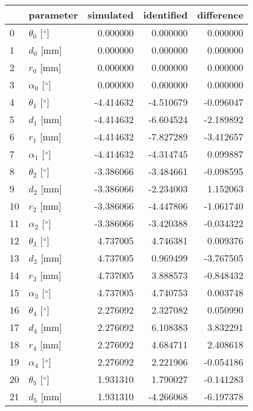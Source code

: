 \documentclass{standalone}%
\begin{document}
%
\normalsize%
\begin{tabular}{llrrr}
\toprule
{} &                 parameter & simulated & identified & difference \\
\midrule
0  &  $\theta_{0}$ [$\degree$] &  0.000000 &   0.000000 &   0.000000 \\
1  &              $d_{0}$ [mm] &  0.000000 &   0.000000 &   0.000000 \\
2  &              $r_{0}$ [mm] &  0.000000 &   0.000000 &   0.000000 \\
3  &  $\alpha_{0}$ [$\degree$] &  0.000000 &   0.000000 &   0.000000 \\
4  &  $\theta_{1}$ [$\degree$] & -4.414632 &  -4.510679 &  -0.096047 \\
5  &              $d_{1}$ [mm] & -4.414632 &  -6.604524 &  -2.189892 \\
6  &              $r_{1}$ [mm] & -4.414632 &  -7.827289 &  -3.412657 \\
7  &  $\alpha_{1}$ [$\degree$] & -4.414632 &  -4.314745 &   0.099887 \\
8  &  $\theta_{2}$ [$\degree$] & -3.386066 &  -3.484661 &  -0.098595 \\
9  &              $d_{2}$ [mm] & -3.386066 &  -2.234003 &   1.152063 \\
10 &              $r_{2}$ [mm] & -3.386066 &  -4.447806 &  -1.061740 \\
11 &  $\alpha_{2}$ [$\degree$] & -3.386066 &  -3.420388 &  -0.034322 \\
12 &  $\theta_{3}$ [$\degree$] &  4.737005 &   4.746381 &   0.009376 \\
13 &              $d_{3}$ [mm] &  4.737005 &   0.969499 &  -3.767505 \\
14 &              $r_{3}$ [mm] &  4.737005 &   3.888573 &  -0.848432 \\
15 &  $\alpha_{3}$ [$\degree$] &  4.737005 &   4.740753 &   0.003748 \\
16 &  $\theta_{4}$ [$\degree$] &  2.276092 &   2.327082 &   0.050990 \\
17 &              $d_{4}$ [mm] &  2.276092 &   6.108383 &   3.832291 \\
18 &              $r_{4}$ [mm] &  2.276092 &   4.684711 &   2.408618 \\
19 &  $\alpha_{4}$ [$\degree$] &  2.276092 &   2.221906 &  -0.054186 \\
20 &  $\theta_{5}$ [$\degree$] &  1.931310 &   1.790027 &  -0.141283 \\
21 &              $d_{5}$ [mm] &  1.931310 &  -4.266068 &  -6.197378 \\

\end{tabular}
\end{document}

